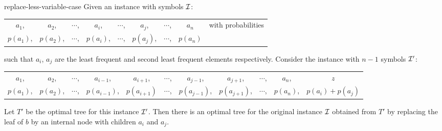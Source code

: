 \begin{Theorem}{}{replace-less-variable-case}
	Given an instance with symbols $\mathcal{I}$: \begin{center}
		\begin{tabular}{ccccccccc}
			$a_1$, & $a_2$, & $\cdots$, & $a_i$, & $\cdots$, & $a_j$, & $\cdots$, & $a_n$ & with probabilities\\
			$p(a_1)$, & $p(a_2)$, & $\cdots$, & $p(a_i)$, & $\cdots$, & $p(a_j)$, & $\cdots$, & $p(a_n)$ &
		\end{tabular} 
	\end{center}
	such that $a_i$, $a_j$ are the least frequent and second least frequent elements respectively. Consider the instance with $n-1$ symbols $\mathcal{I}'$:
	\begin{center}
		\begin{tabular}{ccccccccccc}
			$a_1$, & $a_2$, & $\cdots$, & $a_{i-1}$, & $a_{i+1}$,& $\cdots$, & $a_{j-1}$,& $a_{j+1}$, & $\cdots$, & $a_n$, & $z$ \\
			$p(a_1)$, & $p(a_2)$, & $\cdots$, & $p(a_{i-1})$,&$p(a_{i+1})$  & $\cdots$, & $p(a_{j-1})$,& $p(a_{j+1})$, & $\cdots$, & $p(a_n)$, & $p(a_i)+p(a_j)$ 
		\end{tabular} 
	\end{center}
	Let $T'$ be the optimal tree for this instance $\mathcal{I}'$. Then there is an optimal tree for the original instance $\mathcal{I}$ obtained from $T'$ by replacing the leaf of $b$ by an internal node with children $a_i$ and $a_j$.
\end{Theorem}
